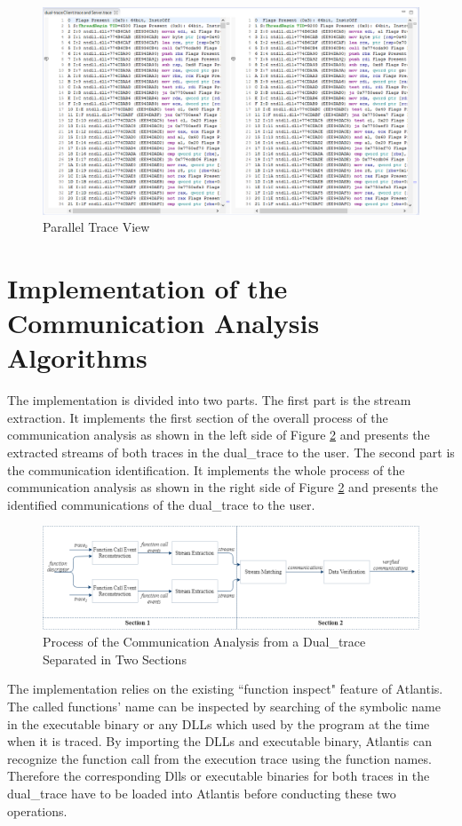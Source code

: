 \begin{figure}[H]
\centerline{\includegraphics[scale=0.6]{Figures/paralleleditor}}
 \caption{Parallel Trace View}
\label{parallelview}
\end{figure}

\section{Implementation of the Communication Analysis Algorithms}
The implementation is divided into two parts. The first part is the stream extraction. It implements the first section of the overall process of the communication analysis as shown in the left side of Figure \ref{overviewintwo} and presents the extracted streams of both traces in the dual\_trace to the user. The second part is the communication identification. It implements the whole process of the communication analysis as shown in the right side of Figure \ref{overviewintwo} and presents the identified communications of the dual\_trace to the user.

\begin{figure}[H]
\centerline{\includegraphics[scale=0.55]{Figures/overviewintwo}}
\caption{Process of the Communication Analysis from a Dual\_trace Separated in Two Sections}
\label{overviewintwo}
\end{figure}

The implementation relies on the existing ``function inspect" feature of Atlantis. The called functions' name can be inspected  by  searching of the symbolic name in the executable binary or any DLLs which used by the program at the time when it is traced. By importing the DLLs and executable binary, Atlantis can recognize the function call from the execution trace using the function names. Therefore the corresponding Dlls or executable binaries for both traces in the dual\_trace have to be loaded into Atlantis before conducting these two operations.

